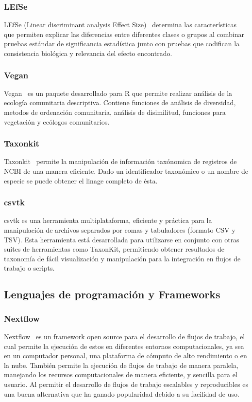 \subsubsection{LEfSe}
LEfSe (Linear discriminant analysis Effect Size)~\cite{segata2011metagenomic}  determina las características que permiten explicar las diferencias entre diferentes clases o grupos al combinar pruebas estándar de significancia estadística junto con pruebas que codifican la consistencia biológica y relevancia del efecto encontrado. 
\subsubsection{Vegan}
Vegan~\cite{dixon2003vegan} es un paquete desarrollado para R que permite realizar análisis de la ecología comunitaria descriptiva. Contiene funciones de análisis de diversidad,  metodos de ordenación comunitaria, análisis de disimilitud, funciones para vegetación y ecólogos comunitarios.



\subsubsection{Taxonkit}
Taxonkit~\cite{SHEN2021844} permite la manipulación de información taxónomica de registros de NCBI de una manera eficiente. Dado un identificador taxonómico o un nombre de especie se puede obtener el linage completo de ésta.

\subsubsection{csvtk}
csvtk es una herramienta multiplataforma, eficiente y práctica para la manipulación de archivos separados por comas y tabuladores (formato CSV y TSV). 
Esta herramienta está desarrollada para utilizarse en conjunto con otras suites de herramientas como TaxonKit, permitiendo obtener resultados de taxonomía de fácil visualización y manipulación para la integración en flujos de trabajo o scripts.
\subsection{Lenguajes de programación y Frameworks}
\subsubsection{Nextflow}
Nextflow~\cite{di2017nextflow} es un framework open source para el desarrollo de flujos de trabajo, el cual permite la ejecución de estos en diferentes entornos computacionales, ya sea en un computador personal, una plataforma de cómputo de alto rendimiento o en la nube. También permite la ejecución de flujos de trabajo de manera paralela, manejando los recursos computacionales de manera eficiente, y sencilla para el usuario.
 Al permitir el desarrollo de flujos de trabajo escalables y reproducibles es una buena alternativa que ha ganado popularidad debido a su facilidad de uso.


